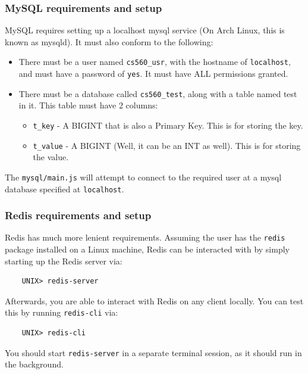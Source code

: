 \documentclass[letterpaper, 10 pt, conference]{ieeeconf}
\begin{document}
\subsubsection{ MySQL requirements and setup}
MySQL requires setting up a localhost mysql service (On Arch Linux, this is known as mysqld). It must also conform to the following:
\begin{itemize}
    \item There must be a user named \texttt{cs560\_usr}, with the hostname of \texttt{localhost}, and must have a password of \texttt{yes}. It must have ALL permissions granted.
    \item There must be a database called \texttt{cs560\_test}, along with a table named test in it. This table must have 2 columns:
    \begin{itemize}
        \item \texttt{t\_key} - A BIGINT that is also a Primary Key. This is for storing the key.
        \item \texttt{t\_value} - A BIGINT (Well, it can be an INT as well). This is for storing the value.
    \end{itemize}
\end{itemize}
The \texttt{mysql/main.js} will attempt to connect to the required user at a mysql database specified at \texttt{localhost}.\\
\subsubsection{Redis requirements and setup}
Redis has much more lenient requirements. Assuming the user has the \texttt{redis} package installed on a Linux machine, Redis can be interacted with by simply starting up the Redis server via:
\begin{verbatim}
    UNIX> redis-server
\end{verbatim}
Afterwards, you are able to interact with Redis on any client locally. You can test this by running \texttt{redis-cli} via:
\begin{verbatim}
    UNIX> redis-cli
\end{verbatim}
You should start  \texttt{redis-server} in a separate terminal session, as it should run in the background.\\
\end{document}
